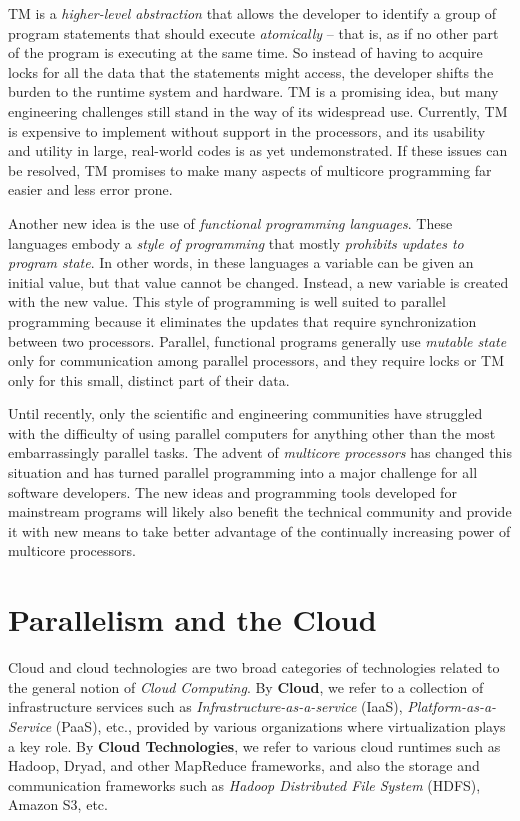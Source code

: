 \documentclass[twocolumn]{article}
\begin{document}
TM is a \emph{higher-level abstraction} that allows the developer to identify a group of
program statements that should execute \emph{atomically} -- that is, as if no other part of
the program is executing at the same time. So instead of having to acquire locks for
all the data that the statements might access, the developer shifts the burden to the
runtime system and hardware. TM is a promising idea, but many engineering challenges
still stand in the way of its widespread use. Currently, TM is expensive to implement
without support in the processors, and its usability and utility in large, real-world
codes is as yet undemonstrated. If these issues can be resolved, TM promises
to make many aspects of multicore programming far easier and less error prone.

Another new idea is the use of \emph{functional programming languages}. These languages
embody a \emph{style of programming} that mostly \emph{prohibits updates to program
state}. In other words, in these languages a variable can be given an initial value,
but that value cannot be changed. Instead, a new variable is created with the new
value. This style of programming is well suited to parallel programming because
it eliminates the updates that require synchronization between two processors.
Parallel, functional programs generally use \emph{mutable state} only for communication
among parallel processors, and they require locks or TM only for this small, distinct
part of their data.

Until recently, only the scientific and engineering communities have struggled
with the difficulty of using parallel computers for anything other than the most
embarrassingly parallel tasks. The advent of \emph{multicore processors} has changed this
situation and has turned parallel programming into a major challenge for all software
developers. The new ideas and programming tools developed for mainstream
programs will likely also benefit the technical community and provide it with new
means to take better advantage of the continually increasing power of multicore
processors.

\section{Parallelism and the Cloud}
Cloud and cloud technologies are two broad categories of technologies related to the general notion of \emph{Cloud Computing}. 
By  {\bfseries Cloud}, we refer to a collection of infrastructure services such as \emph{Infrastructure-as-a-service} (IaaS), \emph{Platform-as-a-Service} (PaaS), etc., provided by various organizations where virtualization plays a key role. 
By  {\bfseries Cloud Technologies}, we refer to various cloud runtimes such as Hadoop, Dryad, and other MapReduce frameworks, and also the storage and communication frameworks such as \emph{Hadoop Distributed File System} (HDFS), Amazon S3, etc.
\end{document}
